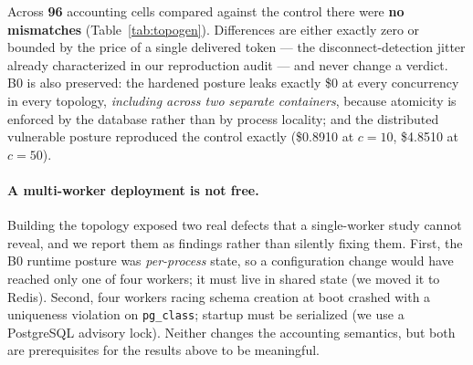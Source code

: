 \documentclass[11pt]{article}
\begin{document}
Across \textbf{96} accounting cells compared against the control there were
\textbf{no mismatches} (Table~\ref{tab:topogen}). Differences are either exactly zero or
bounded by the price of a single delivered token --- the disconnect-detection jitter
already characterized in our reproduction audit --- and never change a verdict. B0 is
also preserved: the hardened posture leaks exactly \$0 at every concurrency in every
topology, \emph{including across two separate containers}, because atomicity is enforced
by the database rather than by process locality; and the distributed vulnerable posture
reproduced the control exactly (\$0.8910 at $c{=}10$, \$4.8510 at $c{=}50$).

\paragraph{A multi-worker deployment is not free.} Building the topology exposed two real
defects that a single-worker study cannot reveal, and we report them as findings rather
than silently fixing them. First, the B0 runtime posture was \emph{per-process} state, so
a configuration change would have reached only one of four workers; it must live in
shared state (we moved it to Redis). Second, four workers racing schema creation at boot
crashed with a uniqueness violation on \texttt{pg\_class}; startup must be serialized (we
use a PostgreSQL advisory lock). Neither changes the accounting semantics, but both are
prerequisites for the results above to be meaningful.
\end{document}
